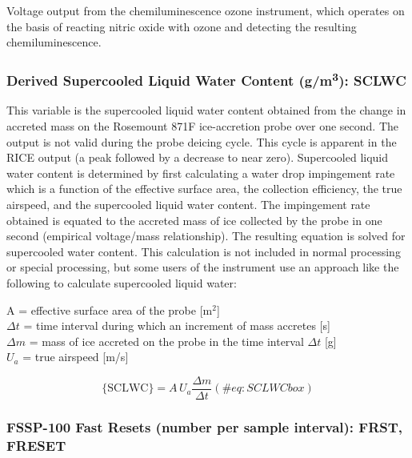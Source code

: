 \documentclass[
  english,
]{book}
\begin{document}
Voltage output from the chemiluminescence ozone instrument, which
operates on the basis of reacting nitric oxide with ozone and detecting
the resulting chemiluminescence.

\hypertarget{SCLWC}{%
\subsubsection*{\texorpdfstring{Derived Supercooled Liquid Water Content
(g/m\textsuperscript{3}):
SCLWC}{Derived Supercooled Liquid Water Content (g/m3): SCLWC}}\label{SCLWC}}

This variable is the supercooled liquid water content obtained from the
change in accreted mass on the Rosemount 871F ice-accretion probe over
one second. The output is not valid during the probe deicing cycle. This
cycle is apparent in the RICE output (a peak followed by a decrease to
near zero). Supercooled liquid water content is determined by first
calculating a water drop impingement rate which is a function of the
effective surface area, the collection efficiency, the true airspeed,
and the supercooled liquid water content. The impingement rate obtained
is equated to the accreted mass of ice collected by the probe in one
second (empirical voltage/mass relationship). The resulting equation is
solved for supercooled water content. This calculation is not included
in normal processing or special processing, but some users of the
instrument use an approach like the following to calculate supercooled
liquid water:

A = effective surface area of the probe
{[}m\(^{2}\){]}\\
\(\Delta t\) = time
interval
during which an increment of mass accretes {[}s{]}\\
\(\Delta m\) = mass of ice accreted on the probe
in the time interval \(\Delta t\) {[}g{]}\\
\(U_{a}\) = true airspeed {[}m/s{]}

\begin{equation}
\mathrm{\{SCLWC\}}=A\,U_{a}\frac{\Delta m}{\Delta t}
(\#eq:SCLWCbox)
\end{equation}

\hypertarget{freset}{%
\subsubsection*{FSSP-100 Fast Resets (number per sample interval): FRST,
FRESET}\label{freset}}
\end{document}
